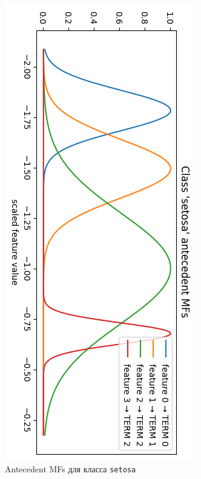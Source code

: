 \begin{figure}[H]
  \centering
  \includegraphics[width=0.9\linewidth]{images/mf_in_setosa.png}
  \caption{Antecedent MFs для класса \texttt{setosa}}
  \label{fig:mf_in_setosa}
\end{figure}

